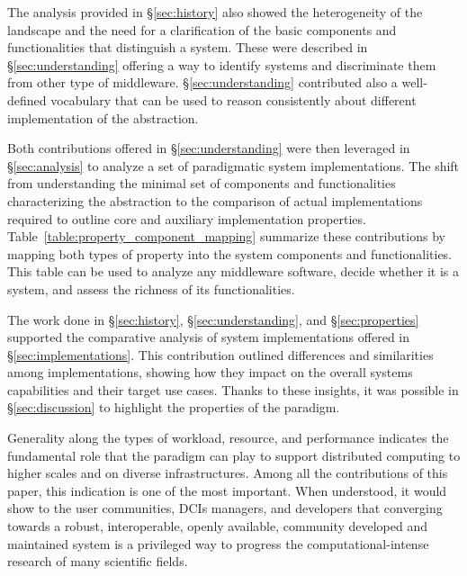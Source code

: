 \documentclass{sig-alternate}
\begin{document}
The analysis provided in \S\ref{sec:history} also showed the heterogeneity of
the \pilot landscape and the need for a clarification of the basic components
and functionalities that distinguish a \pilot system. These were described in
\S\ref{sec:understanding} offering a way to identify \pilot systems and
discriminate them from other type of middleware. \S\ref{sec:understanding}
contributed also a well-defined vocabulary that can be used to reason
consistently about different implementation of the \pilot abstraction.

Both contributions offered in \S\ref{sec:understanding} were then leveraged in
\S\ref{sec:analysis} to analyze a set of paradigmatic \pilot system
implementations. The shift from understanding the minimal set of components and
functionalities characterizing the \pilot abstraction to the comparison of
actual \pilot implementations required to outline core and auxiliary
implementation properties. Table~\ref{table:property_component_mapping}
summarize these contributions by mapping both types of property into the \pilot
system components and functionalities. This table can be used to analyze any
middleware software, decide whether it is a \pilot system, and assess the
richness of its functionalities.

The work done in \S\ref{sec:history}, \S\ref{sec:understanding}, and
\S\ref{sec:properties} supported the comparative analysis of \pilot system
implementations offered in \S\ref{sec:implementations}. This contribution
outlined differences and similarities among implementations, showing how they
impact on the overall \pilot systems capabilities and their target use cases.
Thanks to these insights, it was possible in \S\ref{sec:discussion} to highlight
the properties of the \pilot paradigm.

Generality along the types of workload, resource, and performance indicates the
fundamental role that the \pilot paradigm can play to support distributed
computing to higher scales and on diverse infrastructures. Among all the
contributions of this paper, this indication is one of the most important. When
understood, it would show to the user communities, DCIs managers, and developers
that converging towards a robust, interoperable, openly available, community
developed and maintained \pilot system is a privileged way to progress the
computational-intense research of many scientific fields.

\end{document}
